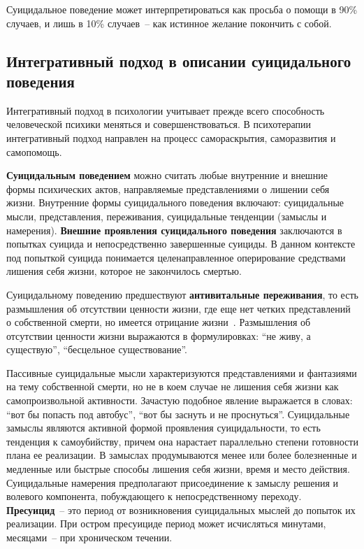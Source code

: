 Суицидальное поведение может интерпретироваться как просьба о помощи в 90\% случаев, и лишь в 10\% случаев~-- как истинное желание покончить с собой.~\cite{Kasyanov}

\subsection{Интегративный подход в описании суицидального поведения}

Интегративный подход в психологии учитывает прежде всего способность человеческой психики меняться и совершенствоваться. В психотерапии интегративный подход направлен на процесс самораскрытия, саморазвития и самопомощь.~\cite{integ}

\textbf{Суицидальным поведением} можно считать любые внутренние и внешние формы психических актов, направляемые представлениями о лишении себя жизни. Внутренние формы суицидального поведения включают: суицидальные мысли, представления, переживания, суицидальные тенденции (замыслы и намерения). \textbf{Внешние проявления суицидального поведения} заключаются в попытках суицида и непосредственно завершенные суициды. В данном контексте под попыткой суицида понимается целенаправленное оперирование средствами лишения себя жизни, которое не закончилось смертью.~\cite{starsen}

Суицидальному поведению предшествуют \textbf{антивитальные переживания}, то есть размышления об отсутствии ценности жизни, где еще нет четких представлений о собственной смерти, но имеется отрицание жизни~\cite{grishina}. Размышления об отсутствии ценности жизни выражаются в формулировках: ``не живу, а существую'', ``бесцельное существование''.~\cite{starsen}

Пассивные суицидальные мысли характеризуются представлениями и фантазиями на тему собственной смерти, но не в коем случае не лишения себя жизни как самопроизвольной активности. Зачастую подобное явление выражается в словах: ``вот бы попасть под автобус'', ``вот бы заснуть и не проснуться''. Суицидальные замыслы являются активной формой проявления суицидальности, то есть тенденция к самоубийству, причем она нарастает параллельно степени готовности плана ее реализации. В замыслах продумываются менее или более болезненные и медленные или быстрые способы лишения себя жизни, время и место действия. Суицидальные намерения предполагают присоединение к замыслу решения и волевого компонента, побуждающего к непосредственному переходу. \textbf{Пресуицид}~-- это период от возникновения суицидальных мыслей до попыток их реализации. При остром пресуициде период может исчисляться минутами, месяцами~-- при хроническом течении.~\cite{starsen}

